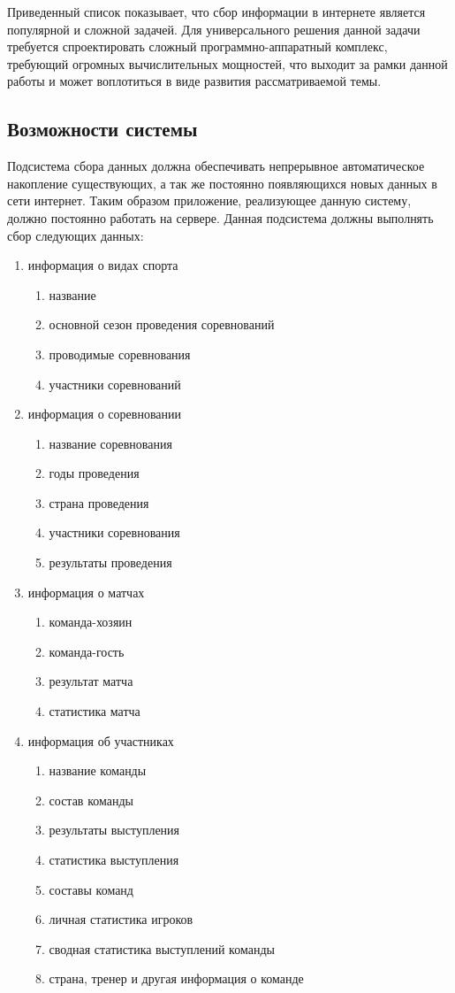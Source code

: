 Приведенный список показывает, что сбор информации в интернете является популярной и сложной задачей. Для универсального решения данной задачи требуется спроектировать сложный программно-аппаратный комплекс, требующий огромных вычислительных мощностей, что выходит за рамки данной работы и может воплотиться в виде развития рассматриваемой темы. 

\subsection{Возможности системы}
Подсистема сбора данных должна обеспечивать непрерывное автоматическое накопление существующих, а так же постоянно появляющихся новых данных в сети интернет. Таким образом приложение, реализующее данную систему, должно постоянно работать на сервере. Данная подсистема должны выполнять сбор следующих данных:
\begin{enumerate}
\item информация о видах спорта
  \begin{enumerate}
    \item название
    \item основной сезон проведения соревнований
    \item проводимые соревнования
    \item участники соревнований
  \end{enumerate}
\item информация о соревновании
  \begin{enumerate}
    \item название соревнования
    \item годы проведения
    \item страна проведения
    \item участники соревнования
    \item результаты проведения
  \end{enumerate}
\item информация о матчах
  \begin{enumerate}
    \item команда-хозяин
    \item команда-гость
    \item результат матча
    \item статистика матча
  \end{enumerate}
\item информация об участниках
  \begin{enumerate}
    \item название команды
    \item состав команды
    \item результаты выступления
    \item статистика выступления
    \item составы команд
    \item личная статистика игроков
    \item сводная статистика выступлений команды
    \item страна, тренер и другая информация о команде
  \end{enumerate}
\end{enumerate}

